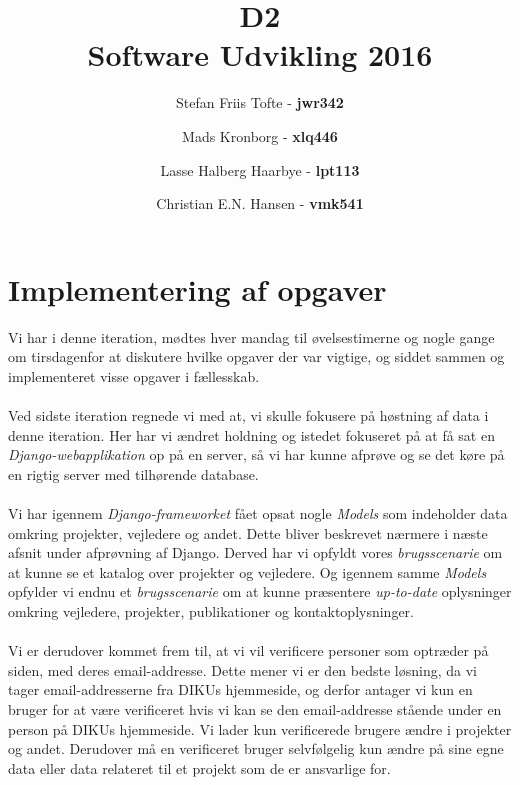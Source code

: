\documentclass[11pt]{article}
\title{
  \vspace{3cm}
  \Huge{D2} \\
  \Large{Software Udvikling 2016}
}
\author{
	\Large{Stefan Friis Tofte} - \textbf{jwr342}%
	\and
	\Large{Mads Kronborg} - \textbf{xlq446}%
	\and
	\Large{Lasse Halberg Haarbye} - \textbf{lpt113}%
	\and
	\Large{Christian E.N. Hansen} - \textbf{vmk541}%
}
\def \ColourPDF {../include/ku-farve}
\def \TitlePDF {../include/ku-en}  %
\begin{document}


\clearpage\maketitle
\thispagestyle{empty}

\newpage
\tableofcontents
\newpage

\section{Implementering af opgaver}
Vi har i denne iteration, mødtes hver mandag til øvelsestimerne og nogle gange om tirsdagenfor at diskutere hvilke opgaver der var vigtige, og siddet sammen og implementeret visse opgaver i fællesskab. \\ \\
Ved sidste iteration regnede vi med at, vi skulle fokusere på høstning af data i denne iteration. Her har vi ændret holdning og istedet fokuseret på at få sat en \textit{Django-webapplikation} op på en server, så vi har kunne afprøve og se det køre på en rigtig server med tilhørende database. \\ \\
Vi har igennem \textit{Django-frameworket} fået opsat nogle \textit{Models} som indeholder data omkring projekter, vejledere og andet. Dette bliver beskrevet nærmere i næste afsnit under afprøvning af Django.
Derved har vi opfyldt vores \textit{brugsscenarie} om at kunne se et katalog over projekter og vejledere. Og igennem samme \textit{Models} opfylder vi endnu et \textit{brugsscenarie} om at kunne præsentere \textit{up-to-date} oplysninger omkring vejledere, projekter, publikationer og kontaktoplysninger. \\ \\
Vi er derudover kommet frem til, at vi vil verificere personer som optræder på siden, med deres email-addresse. Dette mener vi er den bedste løsning, da vi tager email-addresserne fra DIKUs hjemmeside, og derfor antager vi kun en bruger for at være verificeret hvis vi kan se den email-addresse stående under en person på DIKUs hjemmeside. Vi lader kun verificerede brugere ændre i projekter og andet. Derudover må en verificeret bruger selvfølgelig kun ændre på sine egne data eller data relateret til et projekt som de er ansvarlige for.
\end{document}
